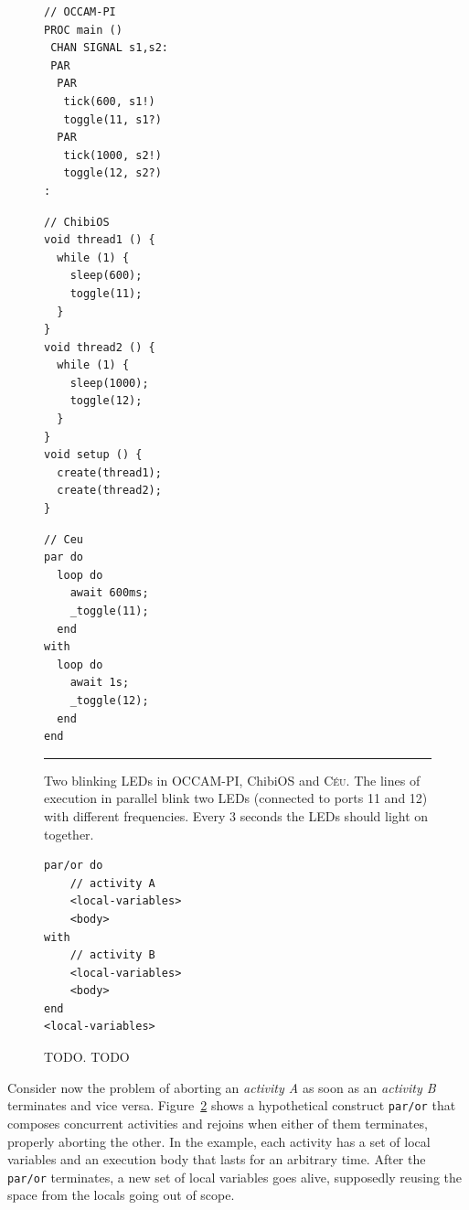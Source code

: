 \documentclass{acm_proc_article-sp}
\newcommand{\CEU}{\textsc{C\'{e}u}\xspace}
\newcommand{\code}[1] {{\small{\texttt{#1}}}}
\newcommand{\1}{\;}
\newcommand{\2}{\;\;}
\newcommand{\3}{\;\;\;}
\newcommand{\5}{\;\;\;\;\;}
\begin{document}
\begin{figure}[t]
\begin{minipage}[t]{0.34\linewidth}
\begin{lstlisting}
// OCCAM-PI
PROC main ()
 CHAN SIGNAL s1,s2:
 PAR
  PAR
   tick(600, s1!)
   toggle(11, s1?)
  PAR
   tick(1000, s2!)
   toggle(12, s2?)
:

\end{lstlisting}
\end{minipage}
%
\begin{minipage}[t]{0.33\linewidth}
\begin{lstlisting}
// ChibiOS
void thread1 () {
  while (1) {
    sleep(600);
    toggle(11);
  }
}
void thread2 () {
  while (1) {
    sleep(1000);
    toggle(12);
  }
}
void setup () {
  create(thread1);
  create(thread2);
}

\end{lstlisting}
\end{minipage}
%
\begin{minipage}[t]{0.31\linewidth}
\begin{lstlisting}
// Ceu
par do
  loop do
    await 600ms;
    _toggle(11);
  end
with
  loop do
    await 1s;
    _toggle(12);
  end
end
\end{lstlisting}
\end{minipage}
%
\rule{14cm}{0.37pt}
\caption{ Two blinking LEDs in OCCAM-PI, ChibiOS and \CEU.\newline
{\small %
The lines of execution in parallel blink two LEDs (connected to ports 11 and 
12) with different frequencies.
Every 3 seconds the LEDs should light on together.
}%
\label{lst.releds}
}
\end{figure}


\begin{figure}[t]
\begin{lstlisting}
par/or do
    // activity A
    <local-variables>
    <body>
with
    // activity B
    <local-variables>
    <body>
end
<local-variables>
\end{lstlisting}
\caption{ TODO.\newline
{\small %
TODO
}%
\label{lst.abortion}
}
\end{figure}

Consider now the problem of aborting an \emph{activity A} as soon as an
\emph{activity B} terminates and vice versa.
%
Figure~\ref{lst.abortion} shows a hypothetical construct \code{par/or} that 
composes concurrent activities and rejoins when either of them terminates, 
properly aborting the other.
%
In the example, each activity has a set of local variables and an execution 
body that lasts for an arbitrary time.
After the \code{par/or} terminates, a new set of local variables goes alive, 
supposedly reusing the space from the locals going out of scope.
\end{document}
